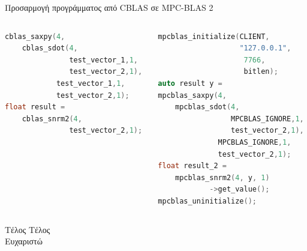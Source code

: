 \documentclass[10pt]{beamer}
\begin{document}
    \begin{frame}[fragile]{Προσαρμογή προγράμματος από CBLAS σε MPC-BLAS 2}
        \begin{columns}[c]
            \begin{column}{.48\textwidth}
                \begin{block}{}
                    \begin{lstlisting}[firstnumber=1, label=glabels, xleftmargin=5pt, basicstyle=\footnotesize, language=C++]
cblas_saxpy(4,
    cblas_sdot(4,
               test_vector_1,1,
               test_vector_2,1),
            test_vector_1,1,
            test_vector_2,1);
float result =
    cblas_snrm2(4,
               test_vector_2,1);
                    \end{lstlisting}
                \end{block}
            \end{column}
            \hfill
            \begin{column}{.48\textwidth}
                \begin{block}{}
                    \begin{lstlisting}[firstnumber=1, label=glabels, xleftmargin=5pt, basicstyle=\footnotesize, language=C++]
mpcblas_initialize(CLIENT,
                   "127.0.0.1",
                    7766,
                    bitlen);
auto result y =
mpcblas_saxpy(4,
    mpcblas_sdot(4,
                 MPCBLAS_IGNORE,1,
                 test_vector_2,1),
              MPCBLAS_IGNORE,1,
              test_vector_2,1);
float result_2 =
    mpcblas_snrm2(4, y, 1)
            ->get_value();
mpcblas_uninitialize();
                    \end{lstlisting}
                \end{block}
            \end{column}%
        \end{columns}
    \end{frame}

    \begin{frame}[c]{Τέλος}
        \centering
        Τέλος \\[20pt]
        Ευχαριστώ
    \end{frame}

%
\end{document}
